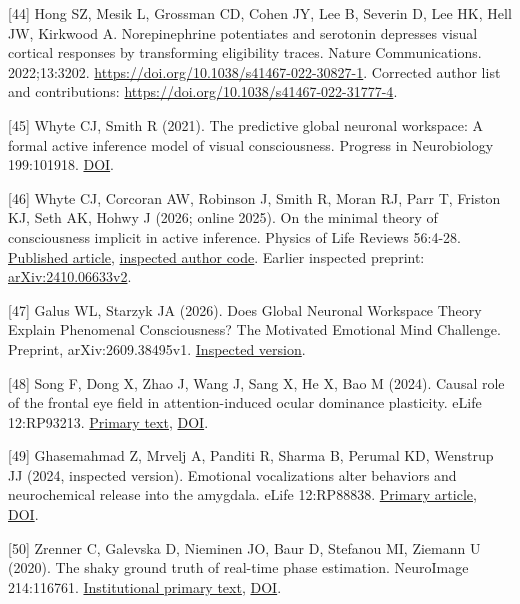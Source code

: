 \documentclass[
  american,
  11pt,
  letterpaper,
]{article}
\begin{document}
{[}44{]} Hong SZ, Mesik L, Grossman CD, Cohen JY, Lee B, Severin D, Lee HK, Hell JW, Kirkwood A. Norepinephrine potentiates and serotonin depresses visual cortical responses by transforming eligibility traces. Nature Communications. 2022;13:3202. \url{https://doi.org/10.1038/s41467-022-30827-1}. Corrected author list and contributions: \url{https://doi.org/10.1038/s41467-022-31777-4}.

{[}45{]} Whyte CJ, Smith R (2021). The predictive global neuronal workspace: A formal active inference model of visual consciousness. Progress in Neurobiology 199:101918. \href{https://doi.org/10.1016/j.pneurobio.2020.101918}{DOI}.

{[}46{]} Whyte CJ, Corcoran AW, Robinson J, Smith R, Moran RJ, Parr T, Friston KJ, Seth AK, Hohwy J (2026; online 2025). On the minimal theory of consciousness implicit in active inference. Physics of Life Reviews 56:4-28. \href{https://doi.org/10.1016/j.plrev.2025.11.002}{Published article}, \href{https://github.com/cjwhyte/ActInfMinConsTheory/tree/9ba97d4ab0e4c9210fbbf94e9675459ab57df18d}{inspected author code}. Earlier inspected preprint: \href{https://arxiv.org/abs/2410.06633v2}{arXiv:2410.06633v2}.

{[}47{]} Galus WL, Starzyk JA (2026). Does Global Neuronal Workspace Theory Explain Phenomenal Consciousness? The Motivated Emotional Mind Challenge. Preprint, arXiv:2609.38495v1. \href{https://arxiv.org/abs/2609.38495v1}{Inspected version}.

{[}48{]} Song F, Dong X, Zhao J, Wang J, Sang X, He X, Bao M (2024). Causal role of the frontal eye field in attention-induced ocular dominance plasticity. eLife 12:RP93213. \href{https://pmc.ncbi.nlm.nih.gov/articles/PMC10937035/}{Primary text}, \href{https://doi.org/10.7554/eLife.93213}{DOI}.

{[}49{]} Ghasemahmad Z, Mrvelj A, Panditi R, Sharma B, Perumal KD, Wenstrup JJ (2024, inspected version). Emotional vocalizations alter behaviors and neurochemical release into the amygdala. eLife 12:RP88838. \href{https://pmc.ncbi.nlm.nih.gov/articles/PMC11249735/}{Primary article}, \href{https://doi.org/10.7554/eLife.88838}{DOI}.

{[}50{]} Zrenner C, Galevska D, Nieminen JO, Baur D, Stefanou MI, Ziemann U (2020). The shaky ground truth of real-time phase estimation. NeuroImage 214:116761. \href{https://acris.aalto.fi/ws/portalfiles/portal/42216767/Zrenner_The_Shaky_Ground.1_s2.0_S1053811920302482_main.pdf}{Institutional primary text}, \href{https://doi.org/10.1016/j.neuroimage.2020.116761}{DOI}.
\end{document}
